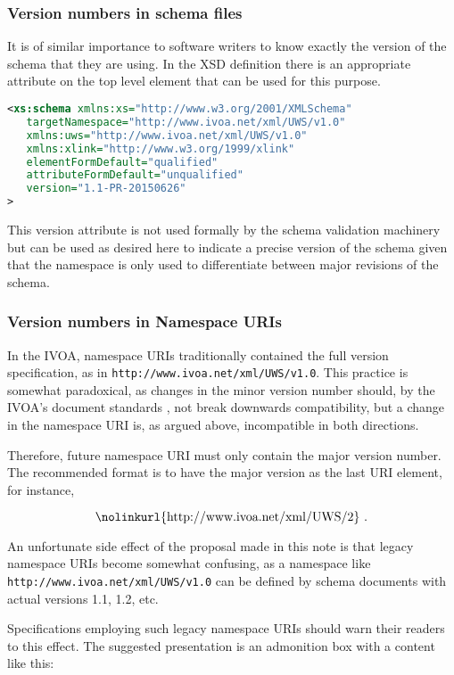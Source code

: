 \documentclass[10pt,a4paper]{ivoa}
\begin{document}
\subsubsection{Version numbers in schema files}
It is of similar importance to software writers to know exactly the version of
the schema that they are using. In the XSD definition there is an appropriate
 attribute on the top level  element that can be
used for this purpose.

\begin{lstlisting}[language=XML]
<xs:schema xmlns:xs="http://www.w3.org/2001/XMLSchema"
   targetNamespace="http://www.ivoa.net/xml/UWS/v1.0"
   xmlns:uws="http://www.ivoa.net/xml/UWS/v1.0"
   xmlns:xlink="http://www.w3.org/1999/xlink" 
   elementFormDefault="qualified"
   attributeFormDefault="unqualified"
   version="1.1-PR-20150626"
>
\end{lstlisting}

This version attribute is not used formally by the schema validation machinery
but can be used as desired here to indicate a precise version of the schema
given that the namespace is only used to differentiate between major revisions
of the schema.


\subsubsection{Version numbers in Namespace URIs}

In the IVOA, namespace URIs traditionally contained the full version
specification, as in \nolinkurl{http://www.ivoa.net/xml/UWS/v1.0}.
This practice is somewhat paradoxical, as changes in the minor version
number should, by the IVOA's document standards
\citep{2010ivoa.spec.0413H}, not break downwards compatibility, but a
change in the namespace URI is, as argued above, incompatible in both
directions.

Therefore, future namespace URI must only contain the major version
number.  The recommended format is to have the major version as the last
URI element, for instance,

$$\hbox{\nolinkurl{http://www.ivoa.net/xml/UWS/2} .}$$

An unfortunate side effect of the proposal made in this note is
that legacy namespace URIs become somewhat confusing, as a namespace
like \nolinkurl{http://www.ivoa.net/xml/UWS/v1.0} can be defined by
schema documents with actual versions 1.1, 1.2, etc.  

Specifications employing such legacy namespace URIs should warn their
readers to this effect.  The suggested presentation is an admonition box
with a content like this:
\end{document}
